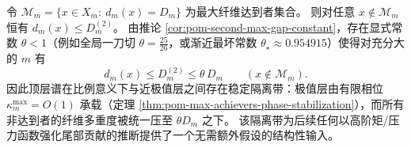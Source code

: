 \begin{remark}\label{rem:pom-maxfiber-isolation-band}
令 \(\mathcal{M}_m=\{x\in X_m:\ d_m(x)=D_m\}\) 为最大纤维达到者集合。
则对任意 \(x\notin\mathcal{M}_m\) 恒有 \(d_m(x)\le D_m^{(2)}\)。
由推论 \ref{cor:pom-second-max-gap-constant}，存在显式常数 \(\theta<1\)（例如全局一刀切 \(\theta=\tfrac{25}{26}\)，或渐近最坏常数 \(\theta_\star\approx 0.954915\)）使得对充分大的 \(m\) 有
\[
d_m(x)\le D_m^{(2)}\le \theta\,D_m\qquad(x\notin\mathcal{M}_m).
\]
因此顶层谱在比例意义下与近极值层之间存在稳定隔离带：极值层由有限相位 \(\kappa_m^{\mathrm{max}}=O(1)\) 承载（定理 \ref{thm:pom-max-achievers-phase-stabilization}），而所有非达到者的纤维多重度被统一压至 \(\theta D_m\) 之下。
该隔离带为后续任何以高阶矩/压力函数强化尾部贡献的推断提供了一个无需额外假设的结构性输入。
\end{remark}

